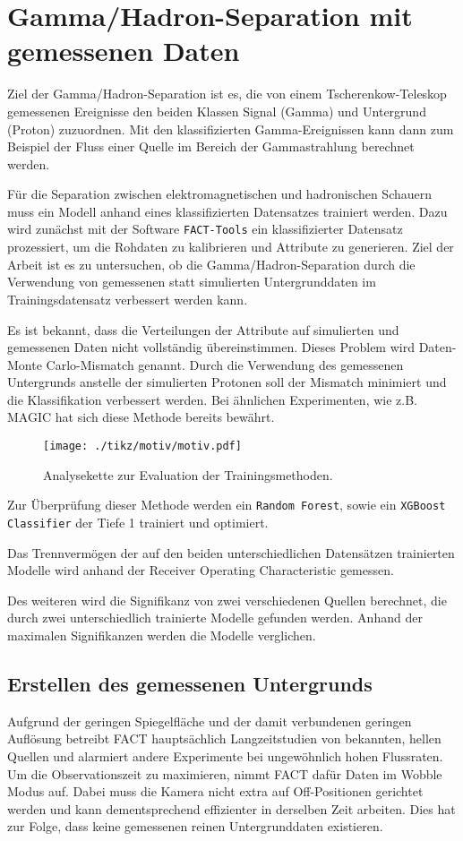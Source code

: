 \chapter{Gamma/Hadron-Separation mit gemessenen Daten}
Ziel der Gamma/Hadron-Separation ist es, die von einem Tscherenkow-Teleskop gemessenen Ereignisse den beiden Klassen Signal (Gamma) und Untergrund (Proton) zuzuordnen.
Mit den klassifizierten Gamma-Ereignissen kann dann zum Beispiel der Fluss einer Quelle im Bereich der Gammastrahlung berechnet werden.

Für die Separation zwischen elektromagnetischen und hadronischen Schauern muss ein Modell anhand eines klassifizierten Datensatzes trainiert werden.
Dazu wird zunächst mit der Software \texttt{FACT-Tools} \cite{Bockermann} ein klassifizierter Datensatz prozessiert, um die Rohdaten zu kalibrieren und Attribute zu generieren.
Ziel der Arbeit ist es zu untersuchen, ob die Gamma/Hadron-Separation durch die Verwendung von gemessenen statt simulierten Untergrunddaten im Trainingsdatensatz verbessert werden kann.

Es ist bekannt, dass die Verteilungen der Attribute auf simulierten und gemessenen Daten nicht vollständig übereinstimmen.
Dieses Problem wird Daten-Monte Carlo-Mismatch genannt.
Durch die Verwendung des gemessenen Untergrunds anstelle der simulierten Protonen soll der Mismatch minimiert und die Klassifikation verbessert werden.
Bei ähnlichen Experimenten, wie z.B. MAGIC \cite{magic} hat sich diese Methode bereits bewährt. 
\begin{figure}[H]
  \centering
  \texttt{[image: ./tikz/motiv/motiv.pdf]}
  \caption{Analysekette zur Evaluation der Trainingsmethoden.}
\end{figure}
Zur Überprüfung dieser Methode werden ein \texttt{Random Forest}, sowie ein \texttt{XGBoost Classifier} der Tiefe 1 trainiert und optimiert.

Das Trennvermögen der auf den beiden unterschiedlichen Datensätzen trainierten Modelle wird anhand der Receiver Operating Characteristic gemessen.

Des weiteren wird die Signifikanz von zwei verschiedenen Quellen berechnet, die durch zwei unterschiedlich trainierte Modelle gefunden werden. 
Anhand der maximalen Signifikanzen werden die Modelle verglichen.
\section{Erstellen des gemessenen Untergrunds}
\label{sec:makeUnter}
Aufgrund der geringen Spiegelfläche und der damit verbundenen geringen Auflösung betreibt FACT hauptsächlich Langzeitstudien von bekannten, hellen Quellen und alarmiert andere Experimente bei ungewöhnlich hohen Flussraten.
Um die Observationszeit zu maximieren, nimmt FACT dafür Daten im Wobble Modus auf. 
Dabei muss die Kamera nicht extra auf Off-Positionen gerichtet werden und kann dementsprechend effizienter in derselben Zeit arbeiten. 
Dies hat zur Folge, dass keine gemessenen reinen Untergrunddaten existieren. 

